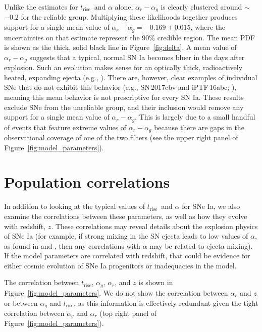 \documentclass[twocolumn]{aastex63}
\newcommand{\trise}{$t_\mathrm{rise}$}
\begin{document}
Unlike the estimates for \trise\ and $\alpha$ alone, $\alpha_r - \alpha_g$ is
clearly clustered around $\sim$${-0.2}$ for the reliable group. Multiplying
these likelihoods together produces support for a single mean value of
$\alpha_r - \alpha_g = -0.169 \pm 0.015$, where the uncertainties on that
estimate represent the 90\% credible region. The mean PDF is shown as the
thick, solid black line in Figure~\ref{fig:delta}. A mean value of $\alpha_r -
\alpha_g$ suggests that a typical, normal SN Ia becomes bluer in the days
after explosion. Such an evolution makes sense for an optically thick,
radioactively heated, expanding ejecta (e.g., \citealt{Piro16,Magee19}). There
are, however, clear examples of individual SNe that do not exhibit this
behavior (e.g., SN\,2017cbv and iPTF\,16abc;
\citealt{Hosseinzadeh17,Miller18}), meaning this mean behavior is not
prescriptive for every SN Ia. These results exclude SNe from the unreliable
group, and their inclusion would remove any support for a single mean value of
$\alpha_r - \alpha_g$. This is largely due to a small handful of events that
feature extreme values of $\alpha_r - \alpha_g$ because there are gaps in the
observational coverage of one of the two filters (see the upper right panel of
Figure~\ref{fig:model_parameters}).

\section{Population correlations}

In addition to looking at the typical values of \trise\ and $\alpha$ for SNe
Ia, we also examine the correlations between these parameters, as well as how
they evolve with redshift, $z$. These correlations may reveal details about
the explosion physics of SNe Ia (for example, if strong mixing in the SN
ejecta leads to low values of $\alpha$, as found in \citealt{Piro16} and
\citealt{Magee18}, then any correlations with $\alpha$ may be related to
ejecta mixing). If the model parameters are correlated with redshift, that
could be evidence for either cosmic evolution of SNe Ia progenitors or
inadequacies in the model.

The correlation between $t_\mathrm{rise}$, $\alpha_g$, $\alpha_r$, and $z$ is
shown in Figure~\ref{fig:model_parameters}. We do not show the correlation
between $\alpha_r$ and $z$ or between $\alpha_g$ and \trise, as this
information is effectively redundant given the tight correlation between
$\alpha_g$ and $\alpha_r$ (top right panel of
Figure~\ref{fig:model_parameters}).
\end{document}
